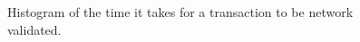 \begin{figure}[!htb]
\centering
{}


\caption{Histogram of the time it takes for a transaction to be network validated. \label{fig:hathor-tips}}
\end{figure}



